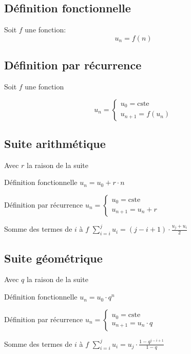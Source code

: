 \documentclass{article}
\newcommand{ \const}{\text{cste}}
\newenvironment{descriptiona}{\begin{description}[leftmargin=!,labelwidth=\widthof{\bfseries The longest label}]}{\end{description}}
\begin{document}
\subsection{Définition fonctionnelle}

Soit $f$ une fonction:
\[u_n = f(n)\]

\subsection{Définition par récurrence}
Soit $f$ une fonction

$$u_n = \begin{cases}
u_0 = \const\\
u_{n+1} = f(u_n)
\end{cases}$$

\subsection{Suite arithmétique}

Avec $r$ la raison de la suite

\begin{descriptiona}
\item[Définition fonctionnelle] $u_n = u_0 + r\cdot n$
\item[Définition par récurrence] $u_n = \begin{cases}
u_0 = \const\\
u_{n+1} = u_n + r
\end{cases}$
\item[Somme des termes de $i$ à $f$]$\displaystyle \sum_{i=i}^{j} u_i = (j-i+1)\cdot\frac{u_j + u_i}{2}$
\end{descriptiona}

\subsection{Suite géométrique}

Avec $q$ la raison de la suite

\begin{descriptiona}
\item[Définition fonctionnelle] $u_n = u_0 \cdot q^n$
\item[Définition par récurrence] $u_n = \begin{cases}
u_0 = \const \\
u_{n+1} = u_n \cdot q
\end{cases}$
\item[Somme des termes de $i$ à $f$] $\displaystyle \sum_{i=i}^{j} u_i = u_j\cdot\frac{1 - q^{j-i+1}}{1 - q}$
\end{descriptiona}
\end{document}
